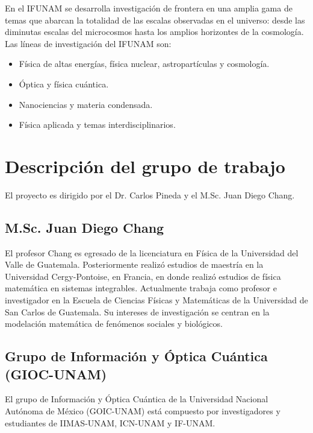 \documentclass[11pt, spanish, letterpage]{article} %
\begin{document}
En el IFUNAM se desarrolla investigación de frontera en una amplia gama de
temas que abarcan la totalidad de las escalas observadas en el universo: desde
las diminutas escalas del microcosmos hasta los amplios horizontes de la
cosmología. Las líneas de investigación del IFUNAM son: \begin{itemize}
	\item Física de altas energías, física nuclear, astropartículas y cosmología.
	\item Óptica y física cuántica.
	\item Nanociencias y materia condensada.
	\item Física aplicada y temas interdisciplinarios.
\end{itemize}

\section{Descripción del grupo de trabajo} %
El proyecto es dirigido por el Dr. Carlos Pineda y el M.Sc. Juan Diego Chang.

\subsection{M.Sc. Juan Diego Chang}
El profesor Chang es egresado de la licenciatura en Física de la Universidad
del Valle de Guatemala. Posteriormente realizó estudios de maestría en la 
Universidad Cergy-Pontoise, en Francia, en donde realizó estudios de física
matemática en sistemas integrables. Actualmente trabaja como profesor
e investigador en la Escuela de Ciencias Físicas y Matemáticas de la
Universidad de San Carlos de Guatemala. Su intereses de investigación se 
centran en la modelación matemática de fenómenos sociales y biológicos. 

\subsection{Grupo de Información y Óptica Cuántica (GIOC-UNAM)}
El grupo de Información y Óptica Cuántica de la Universidad Nacional Autónoma
de México (GOIC-UNAM) está compuesto por investigadores y estudiantes de
IIMAS-UNAM, ICN-UNAM y IF-UNAM. 
\end{document}
